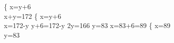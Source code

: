 \left \{  {x=y+6 \\ x+y=172} \; \rightarrow 
\left \{ {x=y+6 \\ x=172-y}\; \rightarrow 
y+6=172-y \; \rightarrow 
2y=166 \; \rightarrow 
y=83 \; \rightarrow 
x=83+6=89 \; \rightarrow
\left \{ {x=89 \\ y=83}\; 